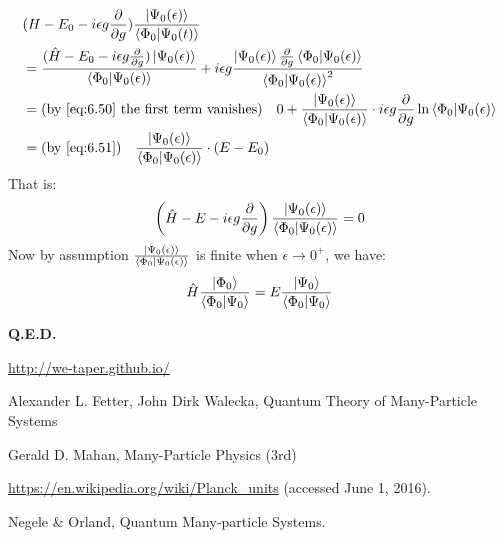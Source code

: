 \documentclass{article}
\numberwithin{equation}{subsection} %
\begin{document}
\begin{align}
&(H-E_0 - i\epsilon g \frac{\partial}{\partial g}) \frac{\ket{\Psi_0(\epsilon)}}
{\braket{\Phi_0|\Psi_0(t)}} \nonumber\\
&= \frac{
	(\hat{H}-E_0-i \epsilon g \frac{\partial}{\partial g})
	\ket{\Psi_0(\epsilon)}
}{
\braket{\Phi_0|\Psi_0(\epsilon)}
}
+ i\epsilon g
\frac{
	\ket{\Psi_0(\epsilon)}\frac{\partial}{\partial g}
	\braket{\Phi_0|\Psi_0(\epsilon)}
}{
\braket{\Phi_0|\Psi_0(\epsilon)}^2
} \nonumber\\
&= \text{(by \ref{eq:6.50} the first term vanishes)\quad} 0
+ \frac{\ket{\Psi_0(\epsilon)}}
{\braket{\Phi_0|\Psi_0(\epsilon)}}
\cdot
i \epsilon g \frac{\partial}{\partial g}
\ln\braket{\Phi_0|\Psi_0(\epsilon)} \nonumber\\
&= \text{(by \ref{eq:6.51})\quad}
\frac{\ket{\Psi_0(\epsilon)}}
{\braket{\Phi_0|\Psi_0(\epsilon)}}
\cdot
(E-E_0)
\end{align}
That is:
\begin{align}
\left( \hat{H} - E - i \epsilon g \frac{\partial}{\partial g}\right) 
\frac{\ket{\Psi_0(\epsilon)}}
{\braket{\Phi_0|\Psi_0(\epsilon)}}
= 0
\end{align}
Now by assumption 
$\frac{\ket{\Psi_0(\epsilon)}}
{\braket{\Phi_0|\Psi_0(\epsilon)}}$ is finite when 
$\epsilon\to 0^+$,
we have:
\begin{align}
\hat{H}\frac{\ket{\Phi_0}}{\braket{\Phi_0|\Psi_0}}
=
E \frac{\ket{\Psi_0}}{\braket{\Phi_0 |\Psi_0}}
\end{align}

\textbf{Q.E.D.}


\begin{thebibliography}{1}

	
	 \url{http://we-taper.github.io/}
	
	 Alexander L. Fetter, John Dirk Walecka, Quantum Theory of Many-Particle Systems
	
	  Gerald D. Mahan, Many-Particle Physics (3rd)
	
	 \url{https://en.wikipedia.org/wiki/Planck_units}
	(accessed June 1, 2016).
	
	 Negele \& Orland, Quantum Many-particle Systems.
	
	
\end{thebibliography}
\end{document}
